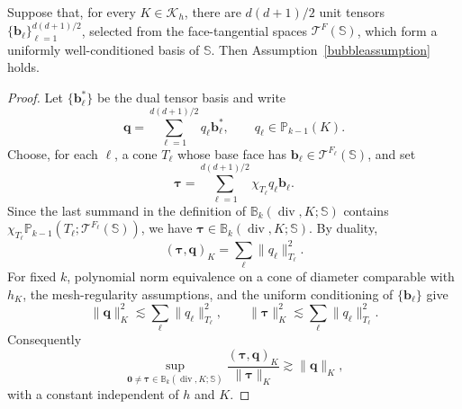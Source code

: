 \documentclass[review,hidelinks,onefignum,onetabnum]{siamart251216}
\renewcommand{\div}{\operatorname{div}}
\begin{document}
\begin{proposition}\label{prop:span-implies-bm}
Suppose that, for every $K\in\mathcal K_h$, there are
$d(d+1)/2$ unit tensors $\{\boldsymbol b_\ell\}_{\ell=1}^{d(d+1)/2}$,
selected from the face-tangential spaces
$\mathscr T^F(\mathbb S)$, which form a uniformly well-conditioned basis of
$\mathbb S$.  Then Assumption~\ref{bubbleassumption} holds.
\end{proposition}
\begin{proof}
Let $\{\boldsymbol b_\ell^*\}$ be the dual tensor basis and write
\[
 \boldsymbol q=\sum_{\ell=1}^{d(d+1)/2}q_\ell\boldsymbol b_\ell^*,
 \qquad q_\ell\in\mathbb P_{k-1}(K).
\]
Choose, for each $\ell$, a cone $T_\ell$ whose base face has
$\boldsymbol b_\ell\in\mathscr T^{F_\ell}(\mathbb S)$, and set
\[
 \boldsymbol\tau
 =\sum_{\ell=1}^{d(d+1)/2}
   \chi_{T_\ell}q_\ell\boldsymbol b_\ell .
\]
Since the last summand in the definition of
$\mathbb B_k(\div,K;\mathbb S)$ contains
$\chi_{T_\ell}\mathbb P_{k-1}(T_\ell;
\mathscr T^{F_\ell}(\mathbb S))$, we have
$\boldsymbol\tau\in\mathbb B_k(\div,K;\mathbb S)$.  By duality,
\[
 (\boldsymbol\tau,\boldsymbol q)_K
 =\sum_\ell\|q_\ell\|_{T_\ell}^2.
\]
For fixed $k$, polynomial norm equivalence on a cone of diameter comparable
with $h_K$, the mesh-regularity assumptions, and the uniform conditioning of
$\{\boldsymbol b_\ell\}$ give
\[
 \|\boldsymbol q\|_K^2
 \lesssim \sum_\ell\|q_\ell\|_{T_\ell}^2,
 \qquad
 \|\boldsymbol\tau\|_K^2
 \lesssim \sum_\ell\|q_\ell\|_{T_\ell}^2.
\]
Consequently
\[
 \sup_{\boldsymbol 0\ne\boldsymbol\tau\in
 \mathbb B_k(\div,K;\mathbb S)}
 \frac{(\boldsymbol\tau,\boldsymbol q)_K}{\|\boldsymbol\tau\|_K}
 \gtrsim \|\boldsymbol q\|_K,
\]
with a constant independent of $h$ and $K$.
\end{proof}
\end{document}
